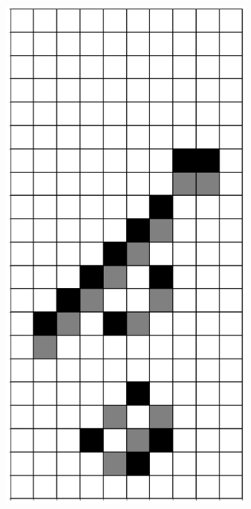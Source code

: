 \documentclass[12pt]{article}
\numberwithin{figure}{section} %
\begin{document}
\begin{figure}[H]
\begin{subfigure}{0.3\textwidth}
     \subcaption{}
   \end{subfigure}
      \newline
            \begin{subfigure}{0.3\textwidth}
     \centering
     \includegraphics[angle=270,width=\linewidth]{Section4/23.3}

\end{subfigure}
\end{figure}
\end{document}
